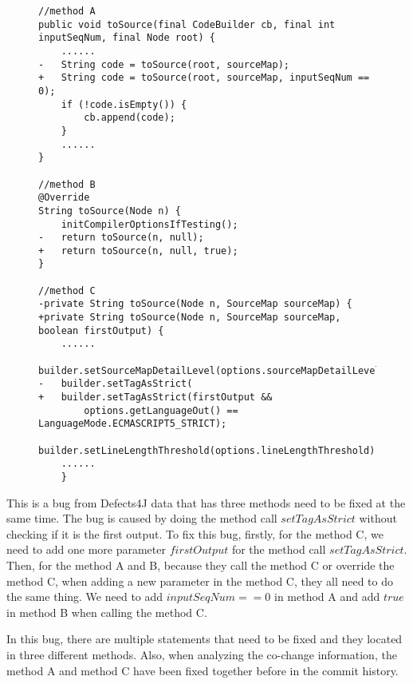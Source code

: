 \begin{figure}[t]
	\centering
	\begin{lstlisting}[]
//method A
public void toSource(final CodeBuilder cb, final int inputSeqNum, final Node root) {
	......
-	String code = toSource(root, sourceMap);
+	String code = toSource(root, sourceMap, inputSeqNum == 0);
	if (!code.isEmpty()) {
		cb.append(code);
	}
	......
}

//method B
@Override
String toSource(Node n) {
	initCompilerOptionsIfTesting();
-	return toSource(n, null);
+ 	return toSource(n, null, true);
}

//method C
-private String toSource(Node n, SourceMap sourceMap) {
+private String toSource(Node n, SourceMap sourceMap, boolean firstOutput) {
	......
	builder.setSourceMapDetailLevel(options.sourceMapDetailLevel);
-   builder.setTagAsStrict(
+   builder.setTagAsStrict(firstOutput && 
		options.getLanguageOut() == LanguageMode.ECMASCRIPT5_STRICT);
	builder.setLineLengthThreshold(options.lineLengthThreshold);
	......	
	}	
	\end{lstlisting}
\end{figure}

This is a bug from Defects4J data that has three methods need to be fixed at the same time. The bug is caused by doing the method call $setTagAsStrict$ without checking if it is the first output. To fix this bug, firstly, for the method C, we need to add one more parameter $firstOutput$ for the method call $setTagAsStrict$. Then, for the method A and B, because they call the method C or override the method C, when adding a new parameter in the method C, they all need to do the same thing. We need to add $inputSeqNum == 0$ in method A and add $true$ in method B when calling the method C.

In this bug, there are multiple statements that need to be fixed and they located in three different methods. Also, when analyzing the co-change information, the method A and method C have been fixed together before in the commit history. 